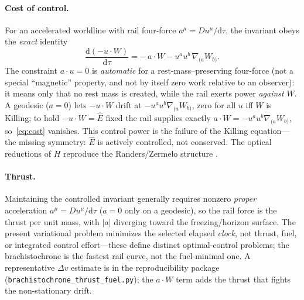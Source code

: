 \documentclass[
    aps, prd, twocolumn, superscriptaddress,
    showpacs, nofootinbib, floatfix
]{revtex4-2}
\newcommand{\Ehat}{\hat E}
\newcommand{\dd}{\mathrm{d}}
\begin{document}
\paragraph{Cost of control.} For an accelerated worldline with rail four-force
$a^\mu=Du^\mu/\dd\tau$, the invariant obeys the \emph{exact} identity
\begin{equation}
    \frac{\dd(-u\cdot W)}{\dd\tau}=-\,a\cdot W-u^a u^b\,\nabla_{(a}W_{b)}.
    \label{eq:cost}
\end{equation}
The constraint $a\cdot u=0$ is \emph{automatic} for a rest-mass--preserving four-force
(not a special ``magnetic'' property, and not by itself zero work relative to an
observer): it means only that no rest mass is created, while the rail exerts power
\emph{against} $W$. A geodesic
($a=0$) lets $-u\cdot W$ drift at $-u^au^b\nabla_{(a}W_{b)}$, zero for all $u$ iff
$W$ is Killing; to hold $-u\cdot W=\Ehat$ fixed the rail supplies exactly
$a\cdot W=-u^au^b\nabla_{(a}W_{b)}$, so~\eqref{eq:cost} vanishes. This control power
is the failure of the Killing equation---the missing symmetry: $\Ehat$ is actively
controlled, not conserved. The optical reductions of $H$
reproduce the Randers/Zermelo structure
\cite{GibbonsRanders2009,CaponioWind}.

\paragraph{Thrust.} Maintaining the controlled invariant generally requires nonzero
\emph{proper} acceleration $a^\mu=Du^\mu/\dd\tau$ ($a=0$ only on a geodesic), so the rail
force is the thrust per unit mass, with $|a|$ diverging toward the freezing/horizon
surface. The present variational problem minimizes the selected elapsed \emph{clock}, not
thrust, fuel, or integrated control effort---these define distinct optimal-control
problems; the brachistochrone is the fastest rail curve, not the fuel-minimal one. A
representative $\Delta v$ estimate is in the reproducibility package
(\texttt{brachistochrone\_thrust\_fuel.py}); the $a\cdot W$ term adds the thrust that
fights the non-stationary drift.
\end{document}

